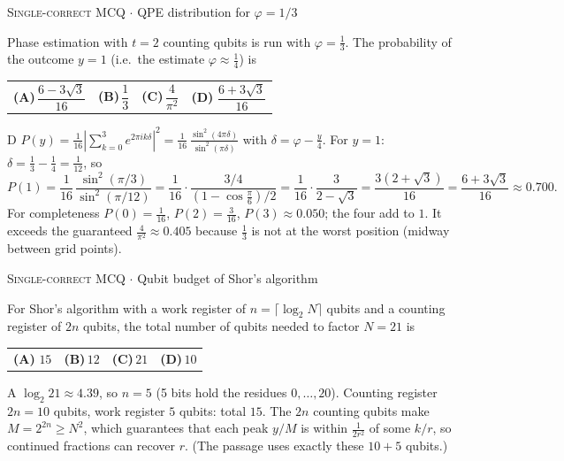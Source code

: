 \documentclass[11pt,a4paper]{article}
\newcommand{\optlabel}[1]{\textbf{(#1)}}
\newcommand{\correctlabel}[1]{\textcolor{okgreen}{\textbf{(#1)}\,\ding{51}}}
\newenvironment{qitem}[1]{\begin{list}{}{\setlength{\leftmargin}{3.3em}\setlength{\labelwidth}{3.1em}%
  \setlength{\labelsep}{0.2em}\setlength{\topsep}{3pt}\setlength{\parsep}{3pt}}\item[\textbf{Q.#1}\hfill]}{\end{list}}
\newcommand{\qsep}{\par\vspace{2pt}{\color{black!15}\hrule}\vspace{4pt}}
\newcommand{\qmeta}[2]{{\footnotesize\color{black!60}\textsc{#1} \;$\cdot$\; #2}\par}
\begin{document}
\begin{qitem}{67}
\qmeta{Single-correct MCQ}{QPE distribution for $\varphi = 1/3$}
Phase estimation with $t = 2$ counting qubits is run with $\varphi = \frac13$. The probability of the outcome $y = 1$
(i.e.\ the estimate $\varphi \approx \frac14$) is
\par\smallskip\noindent\begin{tabularx}{\linewidth}{@{}*{4}{L}@{}}
\optlabel{A}\,$\dfrac{6 - 3\sqrt3}{16}$ & \optlabel{B}\,$\dfrac13$ & \optlabel{C}\,$\dfrac{4}{\pi^2}$ & \correctlabel{D}\,$\dfrac{6 + 3\sqrt3}{16}$
\end{tabularx}
\end{qitem}
\begin{solbox}{D}
$P(y) = \frac{1}{16}\left|\sum_{k=0}^{3}e^{2\pi i k\delta}\right|^2 = \frac{1}{16}\,\frac{\sin^2(4\pi\delta)}{\sin^2(\pi\delta)}$ with
$\delta = \varphi - \frac{y}{4}$. For $y = 1$: $\delta = \frac13 - \frac14 = \frac{1}{12}$, so
\[ P(1) = \frac{1}{16}\,\frac{\sin^2(\pi/3)}{\sin^2(\pi/12)} = \frac{1}{16}\cdot\frac{3/4}{(1 - \cos\frac\pi6)/2} = \frac{1}{16}\cdot\frac{3}{2 - \sqrt3}
   = \frac{3(2 + \sqrt3)}{16} = \frac{6 + 3\sqrt3}{16} \approx 0.700 . \]
For completeness $P(0) = \frac{1}{16}$, $P(2) = \frac{3}{16}$, $P(3) \approx 0.050$; the four add to $1$. It exceeds the guaranteed
$\frac{4}{\pi^2} \approx 0.405$ because $\frac13$ is not at the worst position (midway between grid points).
\end{solbox}
\qsep

\begin{qitem}{68}
\qmeta{Single-correct MCQ}{Qubit budget of Shor's algorithm}
For Shor's algorithm with a work register of $n = \lceil\log_2 N\rceil$ qubits and a counting register of $2n$ qubits,
the total number of qubits needed to factor $N = 21$ is
\par\smallskip\noindent\begin{tabularx}{\linewidth}{@{}*{4}{L}@{}}
\correctlabel{A}\,$15$ & \optlabel{B}\,$12$ & \optlabel{C}\,$21$ & \optlabel{D}\,$10$
\end{tabularx}
\end{qitem}
\begin{solbox}{A}
$\log_2 21 \approx 4.39$, so $n = 5$ (5 bits hold the residues $0, \dots, 20$). Counting register $2n = 10$ qubits, work
register $5$ qubits: total $15$. The $2n$ counting qubits make $M = 2^{2n} \ge N^2$, which guarantees that each peak
$y/M$ is within $\frac{1}{2r^2}$ of some $k/r$, so continued fractions can recover $r$. (The passage uses exactly these
$10 + 5$ qubits.)
\end{solbox}
\qsep
\end{document}
